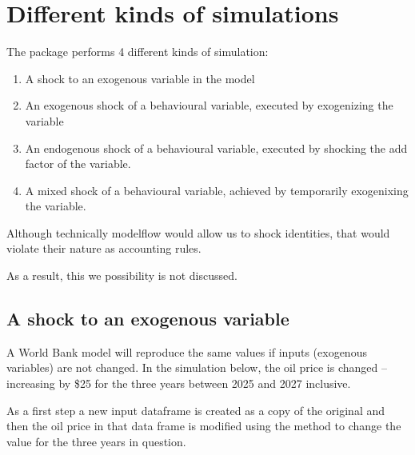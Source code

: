 \documentclass[letterpaper,10pt,english]{jupyterBook}
\begin{document}
\section{Different kinds of simulations}
\label{\detokenize{content/06_WBModels/ScenarioAnalysis:different-kinds-of-simulations}}
\sphinxAtStartPar
The  package performs 4 different kinds of simulation:
\begin{enumerate}
%
\item {} 
\sphinxAtStartPar
A shock to an exogenous variable in the model

\item {} 
\sphinxAtStartPar
An exogenous shock of a behavioural variable, executed by exogenizing the variable

\item {} 
\sphinxAtStartPar
An endogenous shock of a behavioural variable, executed by shocking the add factor of the variable.

\item {} 
\sphinxAtStartPar
A mixed shock of a behavioural variable, achieved by temporarily exogenixing the variable.

\end{enumerate}

\sphinxAtStartPar
Although technically modelflow would allow us to shock identities, that would violate their nature as accounting rules. 

\sphinxAtStartPar
As a result, this we possibility is not discussed.


\subsection{A shock to an exogenous variable}
\label{\detokenize{content/06_WBModels/ScenarioAnalysis:a-shock-to-an-exogenous-variable}}
\sphinxAtStartPar
A World Bank model will reproduce the same values if inputs (exogenous variables) are not changed.  In the simulation below, the oil price is changed – increasing by \$25 for the three years between 2025 and 2027 inclusive.

\sphinxAtStartPar
As a first step a new input dataframe is created as a copy of the original and then the oil price in that data frame is modified using the  method to change the value for the three years in question.
\end{document}
